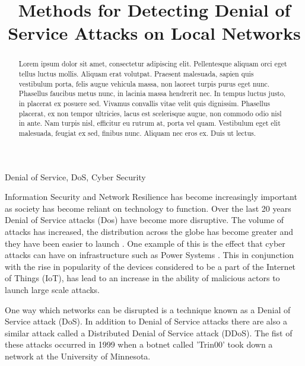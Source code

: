\documentclass[conference, a4paper]{IEEEtran}
\begin{document}
\title{Methods for Detecting Denial of Service Attacks on Local Networks\\
}

\author{
}

\maketitle

\begin{abstract}
    Lorem ipsum dolor sit amet, consectetur adipiscing elit. Pellentesque aliquam orci eget tellus luctus mollis. Aliquam erat volutpat. Praesent malesuada, sapien quis vestibulum porta, felis augue vehicula massa, non laoreet turpis purus eget nunc. Phasellus faucibus metus nunc, in lacinia massa hendrerit nec. In tempus luctus justo, in placerat ex posuere sed. Vivamus convallis vitae velit quis dignissim. Phasellus placerat, ex non tempor ultricies, lacus est scelerisque augue, non commodo odio nisl in ante. Nam turpis nisl, efficitur eu rutrum at, porta vel quam. Vestibulum eget elit malesuada, feugiat ex sed, finibus nunc. Aliquam nec eros ex. Duis ut lectus.
    \newline
\end{abstract}

\begin{IEEEkeywords}
    Denial of Service, DoS, Cyber Security
\end{IEEEkeywords}

Information Security and Network Resilience has become increasingly important as society has become reliant on technology to function.
Over the last 20 years Denial of Service attacks (Dos) have become more disruptive. The volume of attacks has increased, the distribution across the globe has become greater and they have been easier to launch \cite{20_years_of_DDOS}.
One example of this is the effect that cyber attacks can have on infrastructure such as Power Systems \cite{DDOS_power_systems}. 
This in conjunction with the rise in popularity of the devices considered to be a part of the Internet of Things (IoT), has lead to an increase in the ability of malicious actors to launch large scale attacks.

One way which networks can be disrupted is a technique known as a Denial of Service attack (DoS).
In addition to Denial of Service attacks there are also a similar attack called a Distributed Denial of Service attack (DDoS).
The fist of these attacks occurred in 1999 when a botnet called 'Trin00' took down a network at the University of Minnesota. \cite{CERT_DDOS}
\end{document}
